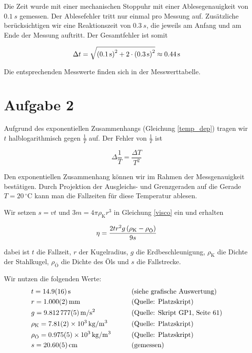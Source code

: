 \documentclass[a4paper,german,12pt,smallheadings]{scrartcl}
\begin{document}
Die Zeit wurde mit einer mechanischen Stoppuhr mit einer Ablesegenauigkeit von
$ \SI{0.1}{s}$ gemessen. Der Ablesefehler tritt nur einmal pro Messung auf.
Zusätzliche berücksichtigen wir eine Reaktionszeit von $\SI{0.3}{s}$, die
jeweils am Anfang und am Ende der Messung auftritt. Der Gesamtfehler ist somit

\begin{equation}
  \Delta t = \sqrt{\del{\SI{0.1}{s}}^2 + 2 \cdot \del{\SI{0.3}{s}}^2} \approx \SI{0.44}{s}
\end{equation}

Die entsprechenden Messwerte finden sich in der Messwerttabelle.

\section*{Aufgabe 2}


Aufgrund des exponentiellen Zusammenhangs (Gleichung \ref{temp_dep}) tragen wir
$t$ halblogarithmisch gegen $\frac{1}{T}$ auf. Der Fehler von $\frac{1}{T}$ ist

\begin{equation}
  \Delta \frac{1}{T} = \frac{\Delta T}{T^2}
\end{equation}

Den exponentiellen Zusammenhang können wir im Rahmen der Messgenauigkeit
bestätigen. Durch Projektion der Ausgleichs- und Grenzgeraden auf die Gerade $T
= 20\,^{\circ} \mathrm{C}$ kann man die Fallzeiten für diese Temperatur
ablesen.

Wir setzen $s = vt$ und $3m = 4 \pi \rho_\text{K} r^3$ in Gleichung \ref{visco}
ein und erhalten

\begin{equation}
  \eta = \frac{2 t r^2 g \del{\rho_\text{K} - \rho_\text{Ö}}}{9 s}
  \label{visco2}
\end{equation}

dabei ist $t$ die Fallzeit, $r$ der Kugelradius, $g$ die Erdbeschleunigung,
$\rho_\text{K}$ die Dichte der Stahlkugel, $\rho_\text{Ö}$ die Dichte des Öls
und $s$ die Fallstrecke.

Wir nutzen die folgenden Werte:
\begin{align*}
  &t = \SI{14.9+-1.6}{s}     && \qquad \text{(siehe grafische Auswertung)} \\
  &r = \SI{1.000+-0.002}{mm} && \qquad \text{(Quelle: Platzskript)} \\
  &g = \SI{9.812777+-0.000005}{m/s^2} && \qquad \text{(Quelle: Skript GP1, Seite 61)} \\
  &\rho_\text{K} = \SI{7.81+-0.02e3}{kg/m^3} && \qquad \text{(Quelle: Platzskript)} \\
  &\rho_\text{Ö} = \SI{0.975+-0.005e3}{kg/m^3} && \qquad \text{(Quelle: Platzskript)} \\
  &s = \SI{20.6+-0.05}{cm} && \qquad \text{(gemessen)}
\end{align*}
\end{document}
